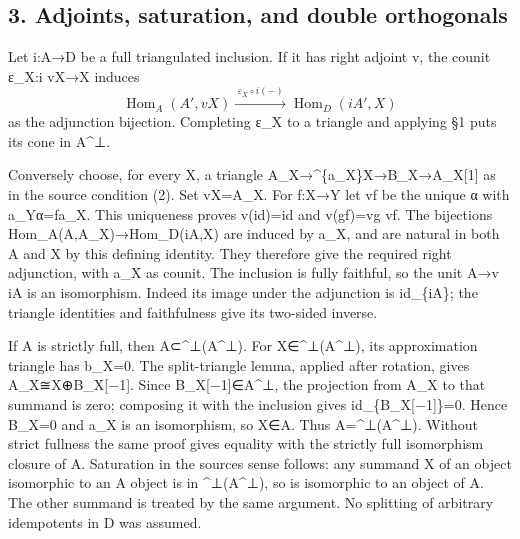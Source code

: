 \subsection{\texorpdfstring{3. Adjoints,\allowbreak{} saturation,\allowbreak{} and double orthogonals}{3.   and double orthogonals}}\label{proofs-11665-12003-adjoints-saturation-and-double-orthogonals}

Let i:\allowbreak{}A\allowbreak{}→D be a full triangulated inclusion. If it has right adjoint v,\allowbreak{} the counit ε\_\allowbreak{}X:\allowbreak{}i vX\allowbreak{}→X induces \[
 \operatorname{Hom}_A(A',vX)
   \xrightarrow{\ \varepsilon_X\circ i(-)\ }
 \operatorname{Hom}_D(iA',X)
\] as the adjunction bijection. Completing ε\_\allowbreak{}X to a triangle and applying §1 puts its cone in A\^{}⊥.

Conversely choose,\allowbreak{} for every X,\allowbreak{} a triangle A\_\allowbreak{}X\allowbreak{}→\textasciicircum{}\{a\_\allowbreak{}X\}X\allowbreak{}→B\_\allowbreak{}X\allowbreak{}→A\_\allowbreak{}X[1]\allowbreak{} as in the source condition (2)\allowbreak{}. Set vX\allowbreak{}=A\_\allowbreak{}X. For f:\allowbreak{}X\allowbreak{}→Y let vf be the unique α with a\_\allowbreak{}Yα\allowbreak{}=fa\_\allowbreak{}X. This uniqueness proves v(id)\allowbreak{}\allowbreak{}=id and v(gf)\allowbreak{}\allowbreak{}=vg vf. The bijections Hom\_\allowbreak{}A(A,\allowbreak{}A\_\allowbreak{}X)\allowbreak{}\allowbreak{}→Hom\_\allowbreak{}D(iA,\allowbreak{}X)\allowbreak{} are induced by a\_\allowbreak{}X,\allowbreak{} and are natural in both A and X by this defining identity. They therefore give the required right adjunction,\allowbreak{} with a\_\allowbreak{}X as counit. The inclusion is fully faithful,\allowbreak{} so the unit A\allowbreak{}→v iA is an isomorphism. Indeed its image under the adjunction is id\_\allowbreak{}\{iA\}; the triangle identities and faithfulness give its two-sided inverse.

If A is strictly full,\allowbreak{} then A⊂\textasciicircum{}⊥(A\textasciicircum{}⊥)\allowbreak{}. For X\allowbreak{}∈\textasciicircum{}⊥(A\textasciicircum{}⊥)\allowbreak{},\allowbreak{} its approximation triangle has b\_\allowbreak{}X\allowbreak{}=0. The split-triangle lemma,\allowbreak{} applied after rotation,\allowbreak{} gives A\_\allowbreak{}X≅X\allowbreak{}⊕B\_\allowbreak{}X[−1]\allowbreak{}. Since B\_\allowbreak{}X[−1]\allowbreak{}\allowbreak{}∈A\textasciicircum{}⊥,\allowbreak{} the projection from A\_\allowbreak{}X to that summand is zero; composing it with the inclusion gives id\_\allowbreak{}\{B\_\allowbreak{}X[−1]\allowbreak{}\}\allowbreak{}=0. Hence B\_\allowbreak{}X\allowbreak{}=0 and a\_\allowbreak{}X is an isomorphism,\allowbreak{} so X\allowbreak{}∈A. Thus A\allowbreak{}=\textasciicircum{}⊥(A\textasciicircum{}⊥)\allowbreak{}. Without strict fullness the same proof gives equality with the strictly full isomorphism closure of A. Saturation in the source\textquotesingle s sense follows:\allowbreak{} any summand X of an object isomorphic to an A object is in \textasciicircum{}⊥(A\textasciicircum{}⊥)\allowbreak{},\allowbreak{} so is isomorphic to an object of A. The other summand is treated by the same argument. No splitting of arbitrary idempotents in D was assumed.

